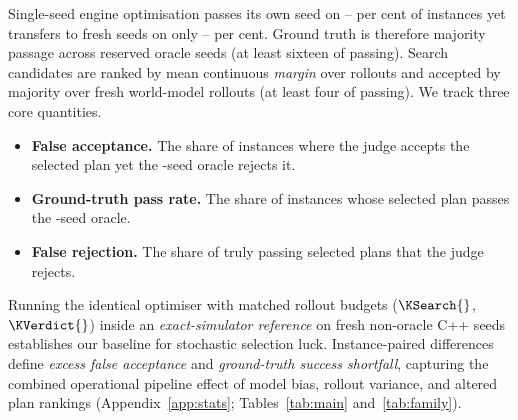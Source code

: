 Single-seed engine optimisation passes its own seed on \NineSeedOwnLo{}--\NineSeedOwnHi{} per cent of instances yet transfers to fresh seeds on only \NineSeedOtherLo{}--\NineSeedOtherHi{} per cent. Ground truth is therefore majority passage across \OracleSeeds{} reserved oracle seeds (at least sixteen of \OracleSeeds{} passing). Search candidates are ranked by mean continuous \emph{margin} over \KSearch{} rollouts and accepted by majority over \KVerdict{} fresh world-model rollouts (at least four of \KVerdict{} passing). We track three core quantities.

\begin{itemize}
\item \textbf{False acceptance.} The share of instances where the judge accepts the selected plan yet the \OracleSeeds-seed oracle rejects it.
\item \textbf{Ground-truth pass rate.} The share of instances whose selected plan passes the \OracleSeeds-seed oracle.
\item \textbf{False rejection.} The share of truly passing selected plans that the judge rejects.
\end{itemize}

Running the identical optimiser with matched rollout budgets ($\KSearch{}$, $\KVerdict{}$) inside an \emph{exact-simulator reference} on fresh non-oracle C++ seeds establishes our baseline for stochastic selection luck. Instance-paired differences define \emph{excess false acceptance} and \emph{ground-truth success shortfall}, capturing the combined operational pipeline effect of model bias, rollout variance, and altered plan rankings (Appendix~\ref{app:stats}; Tables~\ref{tab:main} and~\ref{tab:family}).
